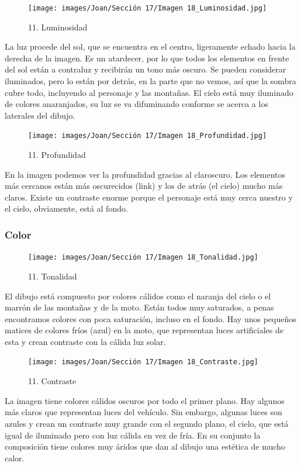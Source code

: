 \documentclass[12pt]{article}
\begin{document}
        \begin{figure}[H]
          \centering
          \texttt{[image: images/Joan/Sección 17/Imagen 18\_Luminosidad.jpg]}
          \caption{\small 11. Luminosidad}
        \end{figure}

        La luz procede del sol, que se encuentra en el centro, ligeramente echado hacia la derecha de la imagen. Es un atardecer, por lo que todos los elementos en frente del sol están a contraluz y recibirán un tono más oscuro. Se pueden considerar iluminados, pero lo están por detrás, en la parte que no vemos, así que la sombra cubre todo, incluyendo al personaje y las montañas. El cielo está muy iluminado de colores anaranjados, su luz se va difuminando conforme se acerca a los laterales del dibujo. 

    \begin{figure}[H]
          \centering
          \texttt{[image: images/Joan/Sección 17/Imagen 18\_Profundidad.jpg]}
          \caption{\small 11. Profundidad}
        \end{figure}

        En la imagen podemos ver la profundidad gracias al claroscuro. Los elementos más cercanos están más oscurecidos (link) y los de atrás (el cielo) mucho más claros. 
    Existe un contraste enorme porque el personaje está muy cerca nuestro y el cielo, obviamente, está al fondo. 

            \subsubsection{Color}
    \begin{figure}[H]
          \centering
          \texttt{[image: images/Joan/Sección 17/Imagen 18\_Tonalidad.jpg]}
          \caption{\small 11. Tonalidad}
        \end{figure}

            El dibujo está compuesto por colores cálidos como el naranja del cielo o el marrón de las montañas y de la moto. Están todos muy saturados, a penas encontramos colores con poca saturación, incluso en el fondo. 
    Hay unos pequeños matices de colores fríos (azul) en la moto, que representan luces artificiales de esta y crean contraste con la cálida luz solar. 

            \begin{figure}[H]
          \centering
          \texttt{[image: images/Joan/Sección 17/Imagen 18\_Contraste.jpg]}
          \caption{\small 11. Contraste}
        \end{figure}
        La imagen tiene colores cálidos oscuros por todo el primer plano. Hay algunos más claros que representan luces del vehículo. Sin embargo, algunas luces son azules y crean un contraste muy grande con el segundo plano, el cielo, que está igual de iluminado pero con luz cálida en vez de fría. 
    En su conjunto la composición tiene colores muy áridos que dan al dibujo una estética de mucho calor. 
\end{document}
